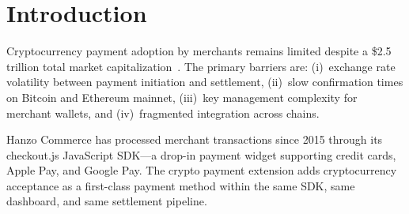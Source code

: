 \section{Introduction}

\label{sec:intro}

Cryptocurrency payment adoption by merchants remains limited despite a
\$2.5 trillion total market capitalization~\cite{coinmarket2024}. The
primary barriers are: (i)~exchange rate volatility between payment
initiation and settlement, (ii)~slow confirmation times on Bitcoin and
Ethereum mainnet, (iii)~key management complexity for merchant wallets,
and (iv)~fragmented integration across chains.

Hanzo Commerce has processed merchant transactions since 2015 through
its checkout.js JavaScript SDK---a drop-in payment widget supporting
credit cards, Apple Pay, and Google Pay. The crypto payment extension
adds cryptocurrency acceptance as a first-class payment method within
the same SDK, same dashboard, and same settlement pipeline.

